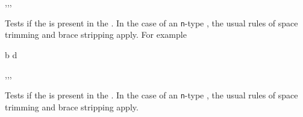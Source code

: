\documentclass[oneside]{book}
\begin{document}
\begin{function}{\clistIfIn,\clistIfInT,\clistIfInF,\clistIfInTF}
\begin{syntax}
  
   
   
    
\end{syntax}
Tests if the  is present in the .
In the case of an \texttt{n}-type , the usual rules
of space trimming and brace stripping apply. For example
\begin{demohigh}
 {b} {} {}
 {d} {} {}
\end{demohigh}
\end{function}

\begin{function}{\clistVarIfIn,\clistVarIfInT,\clistVarIfInF,\clistVarIfInTF}
\begin{syntax}
  
   
   
    
\end{syntax}
Tests if the  is present in the .
In the case of an \texttt{n}-type , the usual rules
of space trimming and brace stripping apply.
\begin{demohigh}
\clistSet {}
\clistVarIfInTF {} {} {}
\clistVarIfInTF {} {} {}
\end{demohigh}
\end{function}
\end{document}
